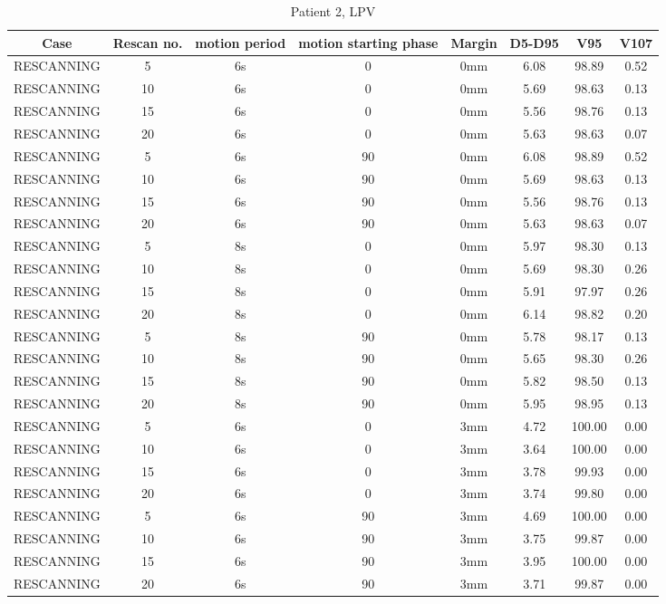 \begin{table}[H]
  \centering
   \scriptsize 
  \caption{Patient 2, LPV}
  \begin{tabular}{|c|c||c|c|c||c|c|c|}
    \hline\hline
    Case & Rescan no. & motion period & motion starting phase & Margin & D5-D95 & V95 & V107\\
    \hline 
RESCANNING & 5 & 6s & 0 & 0mm & 6.08 & 98.89 & 0.52 \\
RESCANNING & 10 & 6s & 0 & 0mm & 5.69 & 98.63 & 0.13 \\
RESCANNING & 15 & 6s & 0 & 0mm & 5.56 & 98.76 & 0.13 \\
RESCANNING & 20 & 6s & 0 & 0mm & 5.63 & 98.63 & 0.07 \\
RESCANNING & 5 & 6s & 90 & 0mm & 6.08 & 98.89 & 0.52 \\
RESCANNING & 10 & 6s & 90 & 0mm & 5.69 & 98.63 & 0.13 \\
RESCANNING & 15 & 6s & 90 & 0mm & 5.56 & 98.76 & 0.13 \\
RESCANNING & 20 & 6s & 90 & 0mm & 5.63 & 98.63 & 0.07 \\
RESCANNING & 5 & 8s & 0 & 0mm & 5.97 & 98.30 & 0.13 \\
RESCANNING & 10 & 8s & 0 & 0mm & 5.69 & 98.30 & 0.26 \\
RESCANNING & 15 & 8s & 0 & 0mm & 5.91 & 97.97 & 0.26 \\
RESCANNING & 20 & 8s & 0 & 0mm & 6.14 & 98.82 & 0.20 \\
RESCANNING & 5 & 8s & 90 & 0mm & 5.78 & 98.17 & 0.13 \\
RESCANNING & 10 & 8s & 90 & 0mm & 5.65 & 98.30 & 0.26 \\
RESCANNING & 15 & 8s & 90 & 0mm & 5.82 & 98.50 & 0.13 \\
RESCANNING & 20 & 8s & 90 & 0mm & 5.95 & 98.95 & 0.13 \\
RESCANNING & 5 & 6s & 0 & 3mm & 4.72 & 100.00 & 0.00 \\
RESCANNING & 10 & 6s & 0 & 3mm & 3.64 & 100.00 & 0.00 \\
RESCANNING & 15 & 6s & 0 & 3mm & 3.78 & 99.93 & 0.00 \\
RESCANNING & 20 & 6s & 0 & 3mm & 3.74 & 99.80 & 0.00 \\
RESCANNING & 5 & 6s & 90 & 3mm & 4.69 & 100.00 & 0.00 \\
RESCANNING & 10 & 6s & 90 & 3mm & 3.75 & 99.87 & 0.00 \\
RESCANNING & 15 & 6s & 90 & 3mm & 3.95 & 100.00 & 0.00 \\
RESCANNING & 20 & 6s & 90 & 3mm & 3.71 & 99.87 & 0.00 \\

\end{tabular}
\end{table}
